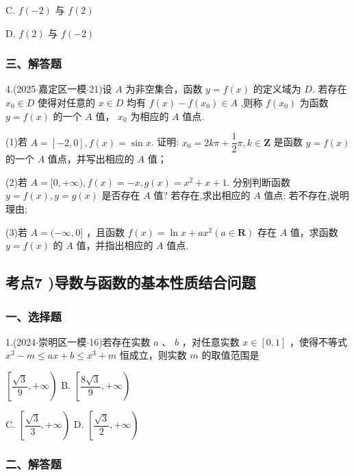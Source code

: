 C. $f\left( {-2}\right)$ 与 $f\left( 2\right)$

D. $f\left( 2\right)$ 与 $f\left( {-2}\right)$

\subsubsection*{三、解答题}

4.(2025$\cdot$嘉定区一模$\cdot$21)设 $A$ 为非空集合，函数 $y = f\left( x\right)$ 的定义域为 $D$. 若存在 ${x}_{0} \in  D$ 使得对任意的 $x \in  D$ 均有 $f\left( x\right)  - f\left( {x}_{0}\right)  \in  A$ ,则称 $f\left( {x}_{0}\right)$ 为函数 $y = f\left( x\right)$ 的一个 $A$ 值， ${x}_{0}$ 为相应的 $A$ 值点.

(1)若 $A = \left\lbrack  {-2,0}\right\rbrack  ,f\left( x\right)  = \sin x$. 证明: ${x}_{0} = {2k\pi } + \dfrac{1}{2}\pi ,k \in  \mathbf{Z}$ 是函数 $y = f\left( x\right)$ 的一个 $A$ 值点，并写出相应的 $A$ 值；

(2)若 $A = \lbrack 0, + \infty ),f\left( x\right)  =  - x,g\left( x\right)  = {x}^{2} + x + 1$. 分别判断函数 $y = f\left( x\right) ,y = g\left( x\right)$ 是否存在 $A$ 值? 若存在,求出相应的 $A$ 值点; 若不存在,说明理由;

(3)若 $A = ( - \infty ,0\rbrack$ ，且函数 $f\left( x\right)  = \ln x + a{x}^{2}\left( {a \in  \mathbf{R}}\right)$ 存在 $A$ 值，求函数 $y = f\left( x\right)$ 的 $A$ 值，并指出相应的 $A$ 值点.

\subsection*{考点7 )导数与函数的基本性质结合问题}

\subsubsection*{一、选择题}

1.(2024$\cdot$崇明区一模$\cdot$16)若存在实数 $a$ 、 $b$ ，对任意实数 $x \in  \left\lbrack  {0,1}\right\rbrack$ ，使得不等式 ${x}^{3} - m \leq  {ax} + b \leq  {x}^{3} + m$ 恒成立，则实数 $m$ 的取值范围是 \dotfill{(\kh{})}

\xx{}{}{}{}$\left\lbrack  {\dfrac{\sqrt{3}}{9}, + \infty }\right)$ B. $\left\lbrack  {\dfrac{8\sqrt{3}}{9}, + \infty }\right)$

C. $\left\lbrack  {\dfrac{\sqrt{3}}{3}, + \infty }\right)$ D. $\left\lbrack  {\dfrac{\sqrt{3}}{2}, + \infty }\right)$

\subsubsection*{二、解答题}

